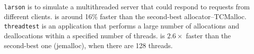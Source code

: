  \texttt{larson} is to simulate a multithreaded server that could respond to requests from different clients. \NM{} is around 16\% faster than the second-best allocator--TCMalloc.  
 \texttt{threadtest} is an application that performs a large number of allocations and deallocations within a specified number of threads. \NM{} is $2.6\times$ faster than the second-best one (jemalloc), when there are 128 threads.









 

